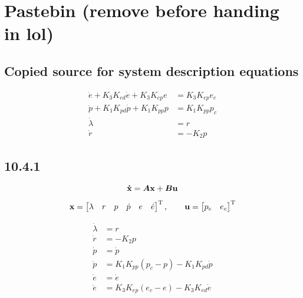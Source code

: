 \section{Pastebin (remove before handing in lol)}



\subsection{Copied source for system description equations}
\begin{subequations}
\label{eq:model_al}
\begin{align}
	\ddot{e} + K_{3} K_{ed} \dot{e} + K_{3} K_{ep} e &= K_{3} K_{ep} e_{c} \label{eq:model_se_al_elev} \\
	\ddot{p} + K_{1} K_{pd} \dot{p} + K_{1} K_{pp} p &= K_{1} K_{pp} p_{c} \label{eq:model_se_al_pitch} \\
	\dot{\lambda} &= r \label{eq:model_se_al_lambda} \\
	\dot{r} &= -K_{2} p \label{eq:model_se_al_r} 
\end{align}
\end{subequations}



\subsection{10.4.1}

\begin{equation}
	\mathbf{\dot{x}}	= \bm{A} \mathbf{x} + \bm{B} \mathbf{u}
\end{equation}

\begin{equation}
	\mathbf{x} =
	\begin{bmatrix}
		\lambda & r & p & \dot{p} & e & \dot{e}
	\end{bmatrix}^{\text{T}}
	,\qquad
	\mathbf{u} =
	\begin{bmatrix}
		p_{c} & e_{c}
	\end{bmatrix}^{\text{T}}
\end{equation}

\begin{subequations}
\begin{align}
	\dot{\lambda}	&= r \\
	\dot{r} 		&= - K_{2} p \\
	\dot{p}			&= \dot{p} \\
	\ddot{p}		&= K_{1} K_{pp} (p_{c} - p) - K_{1} K_{pd} \dot{p} \\
	\dot{e}			&= \dot{e} \\
	\ddot{e}		&= K_{3} K_{ep} (e_{c} - e) - K_{3} K_{ed} \dot{e}
\end{align}
\end{subequations}

